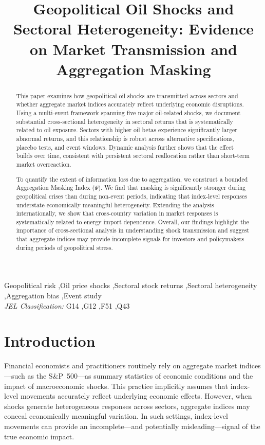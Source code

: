 \documentclass[12pt,preprint,authoryear]{elsarticle}
\begin{document}
\begin{frontmatter}
\title{Geopolitical Oil Shocks and Sectoral Heterogeneity: Evidence on Market Transmission and Aggregation Masking}


\begin{abstract}
This paper examines how geopolitical oil shocks are transmitted across sectors and whether aggregate market indices accurately reflect underlying economic disruptions. Using a multi-event framework spanning five major oil-related shocks, we document substantial cross-sectional heterogeneity in sectoral returns that is systematically related to oil exposure. Sectors with higher oil betas experience significantly larger abnormal returns, and this relationship is robust across alternative specifications, placebo tests, and event windows. Dynamic analysis further shows that the effect builds over time, consistent with persistent sectoral reallocation rather than short-term market overreaction.

To quantify the extent of information loss due to aggregation, we construct a bounded Aggregation Masking Index ($\Psi$). We find that masking is significantly stronger during geopolitical crises than during non-event periods, indicating that index-level responses understate economically meaningful heterogeneity. Extending the analysis internationally, we show that cross-country variation in market responses is systematically related to energy import dependence. Overall, our findings highlight the importance of cross-sectional analysis in understanding shock transmission and suggest that aggregate indices may provide incomplete signals for investors and policymakers during periods of geopolitical stress.
\end{abstract}

\begin{keyword}
Geopolitical risk \sep Oil price shocks \sep Sectoral stock returns \sep Sectoral heterogeneity \sep Aggregation bias \sep Event study
\\\textit{JEL Classification:} G14 \sep G12 \sep F51 \sep Q43
\end{keyword}
\end{frontmatter}

\section{Introduction}
Financial economists and practitioners routinely rely on aggregate market indices---such as the S\&P~500---as summary statistics of economic conditions and the impact of macroeconomic shocks. This practice implicitly assumes that index-level movements accurately reflect underlying economic effects. However, when shocks generate heterogeneous responses across sectors, aggregate indices may conceal economically meaningful variation. In such settings, index-level movements can provide an incomplete---and potentially misleading---signal of the true economic impact.
\end{document}
